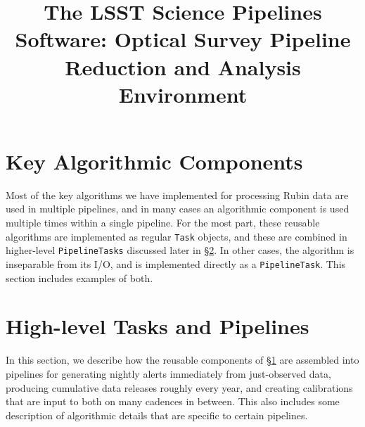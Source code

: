 \documentclass[twocolumn]{aastex7}
\providecommand{\secref}[1]{\hyperref[#1]{\S\ref{#1}}}
\begin{document}
\title{The LSST Science Pipelines Software: Optical Survey Pipeline Reduction and Analysis Environment}











\section{Key Algorithmic Components}
\label{sec:components}

Most of the key algorithms we have implemented for processing Rubin data are used in multiple pipelines, and in many cases an algorithmic component is used multiple times within a single pipeline.
For the most part, these reusable algorithms are implemented as regular \texttt{Task} objects, and these are combined in higher-level \texttt{PipelineTasks} discussed later in \secref{sec:tasks-and-pipelines}.
In other cases, the algorithm is inseparable from its I/O, and is implemented directly as a \texttt{PipelineTask}.
This section includes examples of both.










\section{High-level Tasks and Pipelines}
\label{sec:tasks-and-pipelines}

In this section, we describe how the reusable components of \secref{sec:components} are assembled into pipelines for generating nightly alerts immediately from just-observed data, producing cumulative data releases roughly every year, and creating calibrations that are input to both on many cadences in between.
This also includes some description of algorithmic details that are specific to certain pipelines.
\end{document}

